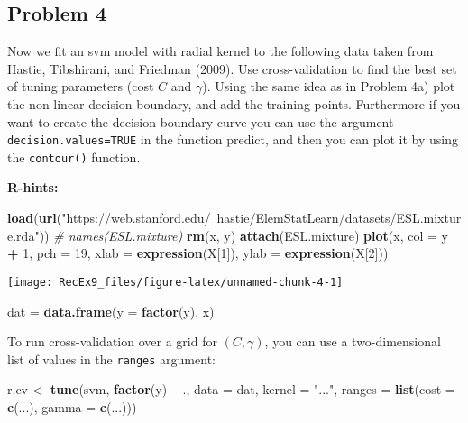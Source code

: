 \documentclass[]{article}
\newenvironment{Shaded}{\begin{snugshade}}{\end{snugshade}}
\newcommand{\CommentTok}[1]{\textcolor[rgb]{0.56,0.35,0.01}{\textit{#1}}}
\newcommand{\DataTypeTok}[1]{\textcolor[rgb]{0.13,0.29,0.53}{#1}}
\newcommand{\DecValTok}[1]{\textcolor[rgb]{0.00,0.00,0.81}{#1}}
\newcommand{\KeywordTok}[1]{\textcolor[rgb]{0.13,0.29,0.53}{\textbf{#1}}}
\newcommand{\NormalTok}[1]{#1}
\newcommand{\OperatorTok}[1]{\textcolor[rgb]{0.81,0.36,0.00}{\textbf{#1}}}
\newcommand{\StringTok}[1]{\textcolor[rgb]{0.31,0.60,0.02}{#1}}
\begin{document}
\hypertarget{problem-4}{%
\subsection{Problem 4}\label{problem-4}}

Now we fit an svm model with radial kernel to the following data taken
from Hastie, Tibshirani, and Friedman (2009). Use cross-validation to
find the best set of tuning parameters (cost \(C\) and \(\gamma\)).
Using the same idea as in Problem 4a) plot the non-linear decision
boundary, and add the training points. Furthermore if you want to create
the decision boundary curve you can use the argument
\texttt{decision.values=TRUE} in the function predict, and then you can
plot it by using the \texttt{contour()} function.

\textbf{R-hints:}

\begin{Shaded}
\begin{Highlighting}[]
\KeywordTok{load}\NormalTok{(}\KeywordTok{url}\NormalTok{(}\StringTok{"https://web.stanford.edu/~hastie/ElemStatLearn/datasets/ESL.mixture.rda"}\NormalTok{))}
\CommentTok{# names(ESL.mixture)}
\KeywordTok{rm}\NormalTok{(x, y)}
\KeywordTok{attach}\NormalTok{(ESL.mixture)}
\KeywordTok{plot}\NormalTok{(x, }\DataTypeTok{col =}\NormalTok{ y }\OperatorTok{+}\StringTok{ }\DecValTok{1}\NormalTok{, }\DataTypeTok{pch =} \DecValTok{19}\NormalTok{, }\DataTypeTok{xlab =} \KeywordTok{expression}\NormalTok{(X[}\DecValTok{1}\NormalTok{]), }\DataTypeTok{ylab =} \KeywordTok{expression}\NormalTok{(X[}\DecValTok{2}\NormalTok{]))}
\end{Highlighting}
\end{Shaded}

\texttt{[image: RecEx9\_files/figure-latex/unnamed-chunk-4-1]}

\begin{Shaded}
\begin{Highlighting}[]
\NormalTok{dat =}\StringTok{ }\KeywordTok{data.frame}\NormalTok{(}\DataTypeTok{y =} \KeywordTok{factor}\NormalTok{(y), x)}
\end{Highlighting}
\end{Shaded}

To run cross-validation over a grid for \((C,\gamma)\), you can use a
two-dimensional list of values in the \texttt{ranges} argument:

\begin{Shaded}
\begin{Highlighting}[]
\NormalTok{r.cv <-}\StringTok{ }\KeywordTok{tune}\NormalTok{(svm, }\KeywordTok{factor}\NormalTok{(y) }\OperatorTok{~}\StringTok{ }\NormalTok{., }\DataTypeTok{data =}\NormalTok{ dat, }\DataTypeTok{kernel =} \StringTok{"..."}\NormalTok{, }\DataTypeTok{ranges =} \KeywordTok{list}\NormalTok{(}\DataTypeTok{cost =} \KeywordTok{c}\NormalTok{(...), }
    \DataTypeTok{gamma =} \KeywordTok{c}\NormalTok{(...)))}
\end{Highlighting}
\end{Shaded}
\end{document}
